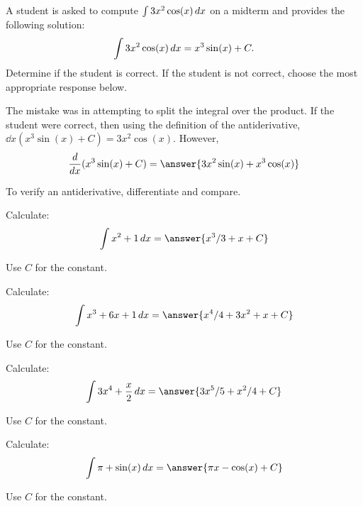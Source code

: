 \documentclass{ximera}
\begin{document}
\begin{problem}
  A student is asked to compute $\int 3x^2 \cos(x) \mathop{}\!d x$ on a midterm and provides the following solution:
  \[
    \int 3x^2 \cos(x) \mathop{}\!d x = x^3 \sin(x) + C.
  \]
  Determine if the student is correct.
  If the student is not correct, choose the most appropriate response below.
  \begin{multipleChoice}
  \end{multipleChoice}
  \begin{problem}
    The mistake was in attempting to split the integral over the
    product.  If the student were correct, then using the definition
    of the antiderivative, $\dd{x}(x^3\sin(x) + C) = 3x^2 \cos(x)$.
    However,
    \[
    \dd{x}(x^3 \sin(x) + C) = \answer{3x^2 \sin(x) + x^3 \cos(x)}
    \]
  \end{problem}
  \begin{hint}
    To verify an antiderivative, differentiate and compare.
  \end{hint}
\end{problem}



\begin{problem} Calculate:
\[
\int x^2 +1 \d x = \answer{x^3/3 + x+ C}
\]
\begin{hint}
  Use $C$ for the constant. 
\end{hint}
\end{problem}

\begin{problem} Calculate:
\[
\int x^3 +6 x + 1 \d x = \answer{x^4/4 + 3x^2 + x+ C}
\]
\begin{hint}
  Use $C$ for the constant. 
\end{hint}
\end{problem}


\begin{problem} Calculate:
\[
\int 3x^4 + \frac{x}{2} \d x = \answer{3x^5/5 + x^2/4 + C}
\]
\begin{hint}
  Use $C$ for the constant. 
\end{hint}
\end{problem}



\begin{problem} Calculate:
\[
\int \pi + \sin(x) \d x = \answer{\pi x - \cos(x)+ C}
\]
\begin{hint}
  Use $C$ for the constant. 
\end{hint}
\end{problem}
\end{document}
